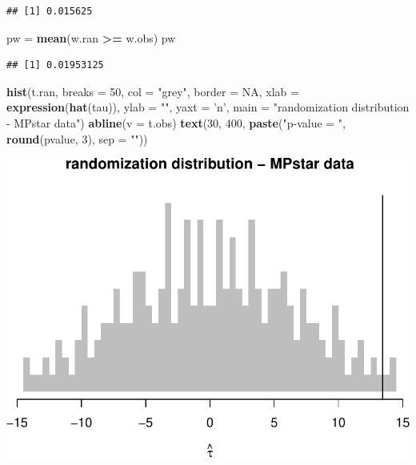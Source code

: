 \documentclass[]{article}
\newenvironment{Shaded}{\begin{snugshade}}{\end{snugshade}}
\newcommand{\KeywordTok}[1]{\textcolor[rgb]{0.13,0.29,0.53}{\textbf{#1}}}
\newcommand{\DataTypeTok}[1]{\textcolor[rgb]{0.13,0.29,0.53}{#1}}
\newcommand{\DecValTok}[1]{\textcolor[rgb]{0.00,0.00,0.81}{#1}}
\newcommand{\StringTok}[1]{\textcolor[rgb]{0.31,0.60,0.02}{#1}}
\newcommand{\OtherTok}[1]{\textcolor[rgb]{0.56,0.35,0.01}{#1}}
\newcommand{\OperatorTok}[1]{\textcolor[rgb]{0.81,0.36,0.00}{\textbf{#1}}}
\newcommand{\NormalTok}[1]{#1}
\begin{document}
\begin{verbatim}
## [1] 0.015625
\end{verbatim}

\begin{Shaded}
\begin{Highlighting}[]
\NormalTok{pw =}\StringTok{ }\KeywordTok{mean}\NormalTok{(w.ran }\OperatorTok{>=}\StringTok{ }\NormalTok{w.obs)}
\NormalTok{pw}
\end{Highlighting}
\end{Shaded}

\begin{verbatim}
## [1] 0.01953125
\end{verbatim}

\begin{Shaded}
\begin{Highlighting}[]
\KeywordTok{hist}\NormalTok{(t.ran, }\DataTypeTok{breaks =} \DecValTok{50}\NormalTok{, }\DataTypeTok{col =} \StringTok{"grey"}\NormalTok{, }\DataTypeTok{border =} \OtherTok{NA}\NormalTok{,}
     \DataTypeTok{xlab =} \KeywordTok{expression}\NormalTok{(}\KeywordTok{hat}\NormalTok{(tau)), }
     \DataTypeTok{ylab =} \StringTok{""}\NormalTok{, }\DataTypeTok{yaxt =} \StringTok{'n'}\NormalTok{, }
     \DataTypeTok{main =} \StringTok{"randomization distribution - MPstar data"}\NormalTok{)}
\KeywordTok{abline}\NormalTok{(}\DataTypeTok{v =}\NormalTok{ t.obs)}
\KeywordTok{text}\NormalTok{(}\DecValTok{30}\NormalTok{, }\DecValTok{400}\NormalTok{, }
     \KeywordTok{paste}\NormalTok{(}\StringTok{"p-value = "}\NormalTok{, }\KeywordTok{round}\NormalTok{(pvalue, }\DecValTok{3}\NormalTok{), }\DataTypeTok{sep =} \StringTok{""}\NormalTok{))}
\end{Highlighting}
\end{Shaded}

\includegraphics{hw3_files/figure-latex/unnamed-chunk-3-1.pdf}
\end{document}

